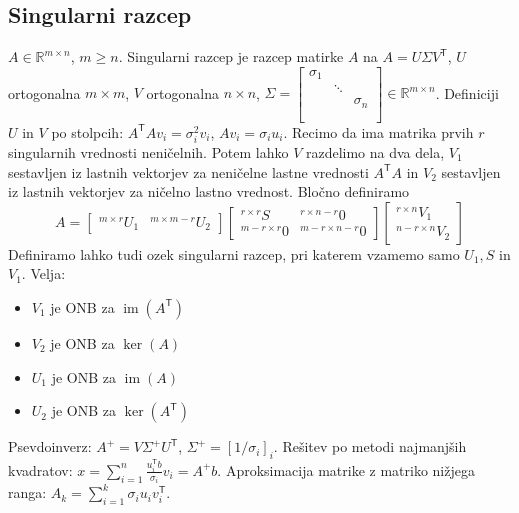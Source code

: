 \documentclass[a4paper,10pt]{article}
\theoremstyle{definition}
\def\R{\mathbb{R}}
\newcommand{\T}{\mathsf{T}\!}
\DeclareMathOperator{\im}{im}
\begin{document}
\subsection*{Singularni razcep}
$A \in \R^{m\times n}$, $m \geq n$. Singularni razcep je razcep matirke $A$ na
$A = U \Sigma V^\T$, $U$ ortogonalna $m\times m$, $V$ ortogonalna $n\times n$,
$\Sigma =
\begin{bmatrix}
  \sigma_1 && \\
  & \ddots & \\
  && \sigma_n \\
  && \\
\end{bmatrix} \in \R^{m\times n}$. Definiciji $U$ in $V$ po stolpcih: $A^\T A v_i = \sigma_i^2 v_i$, $Av_i =
\sigma_iu_i$.
Recimo da ima matrika prvih $r$ singularnih vrednosti neničelnih. Potem lahko
$V$ razdelimo na dva dela, $V_1$ sestavljen iz lastnih vektorjev za neničelne
lastne vrednosti $A^\T A$ in $V_2$ sestavljen iz lastnih vektorjev za ničelno
lastno vrednost. Bločno definiramo
\[ A =
  \begin{bmatrix}
    ^{m\times r} U_1 & ^{m\times m-r}U_2
  \end{bmatrix}
  \begin{bmatrix}
    ^{r\times r} S & ^{r \times n-r}0 \\
    ^{m-r \times r}0 & ^{m-r\times n-r} 0
  \end{bmatrix}
  \begin{bmatrix}
    ^{r \times n} V_1 \\ ^{n-r \times n}V_2
  \end{bmatrix}
\]
Definiramo lahko tudi ozek singularni razcep, pri katerem vzamemo samo $U_1, S$
in $V_1$. Velja: \vspace{-2ex}
\begin{itemize}
  \item $V_1$ je ONB za $\im(A^\T)$
  \item $V_2$ je ONB za $\ker(A)$
  \item $U_1$ je ONB za $\im(A)$
  \item $U_2$ je ONB za $\ker(A^\T)$
\end{itemize}
Psevdoinverz: $A^+ = V\Sigma^+ U^\T$, $\Sigma^+ = [1/\sigma_i]_i$.
Rešitev po metodi najmanjših kvadratov: $x = \sum_{i=1}^n\frac{u_i^\T
b}{\sigma_i}v_i = A^+b$.
Aproksimacija matrike z matriko nižjega ranga:
$A_k = \sum_{i=1}^k \sigma_i u_i v_i^\T$.
\end{document}
